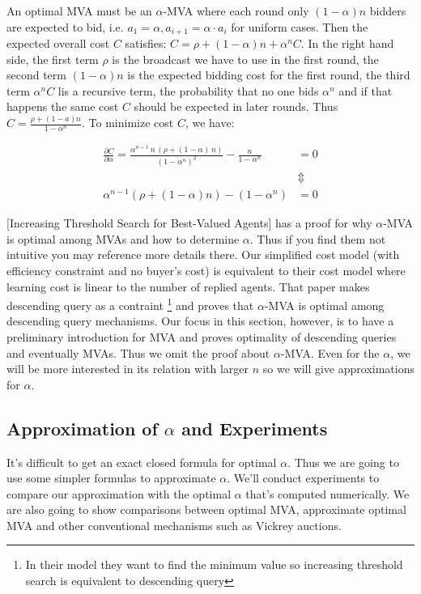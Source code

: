 An optimal MVA must be an $\alpha$-MVA where each round only $(1-\alpha) n$
bidders are expected to bid, i.e. $a_1 = \alpha, a_{i+1} = \alpha \cdot a_i$
for uniform cases. Then the expected overall cost $C$ satisfies: $ C = \rho +
(1-\alpha)n+\alpha^n C$. In the right hand side, the first term $\rho$ is the
broadcast we have to use in the first round, the second term $(1-\alpha)n$ is
the expected bidding cost for the first round, the third term $\alpha^n C$ lis
a recursive term, the probability that no one bids $\alpha^n$ and if that
happens the same cost $C$ should be expected in later rounds.  Thus $C = \frac{
\rho+(1-a)n }{ 1-\alpha^n }$. To minimize cost $C$, we have:

\begin{align}\label{eq:alpha}
\frac{\partial C}{\partial \alpha} = \frac{{\alpha}^{n-1}\,n\,\left(
\rho+\left( 1-\alpha\right) \,n\right) }{{\left( 1-{\alpha}^{n}\right)
}^{2}}-\frac{n}{1-{\alpha}^{n}} &= 0 \nonumber\\
&\Updownarrow\nonumber\\
\alpha^{n-1} (\rho + (1-\alpha)n) - (1-\alpha^n) &= 0
\end{align}

[Increasing Threshold Search for Best-Valued Agents] has a proof for why
$\alpha$-MVA is optimal among MVAs and how to determine $\alpha$. Thus if you
find them not intuitive you may reference more details there.  Our simplified
cost model (with efficiency constraint and no buyer's cost) is equivalent to
their cost model where learning cost is linear to the number of replied agents.
That paper makes descending query as a contraint \footnote{In their model they
want to find the minimum value so increasing threshold search is equivalent to
descending query} and proves that $\alpha$-MVA is optimal among descending
query mechanisms. Our focus in this section, however, is to have a preliminary
introduction for MVA and proves optimality of descending queries and eventually
MVAs. Thus we omit the proof about $\alpha$-MVA. Even for the $\alpha$, we will
be more interested in its relation with larger $n$ so we will give
approximations for $\alpha$.

\subsection{Approximation of $\alpha$ and Experiments}

It's difficult to get an exact closed formula for optimal $\alpha$. Thus we are
going to use some simpler formulas to approximate $\alpha$. We'll conduct
experiments to compare our approximation with the optimal $\alpha$ that's
computed numerically. We are also going to show comparisons between optimal
MVA, approximate optimal MVA and other conventional mechanisms such as Vickrey
auctions.


